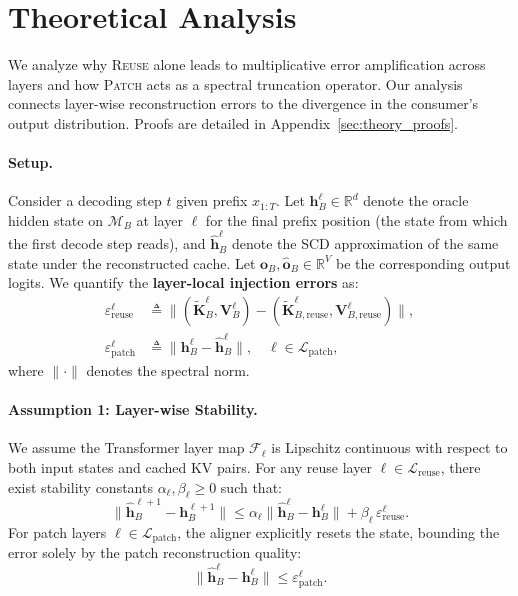 \documentclass{article}
\theoremstyle{plain}
\theoremstyle{definition}
\theoremstyle{remark}
\begin{document}
\section{Theoretical Analysis}
\label{sec:theory}

We analyze why \textsc{Reuse} alone leads to multiplicative error amplification across layers and how \textsc{Patch} acts as a spectral truncation operator.
Our analysis connects layer-wise reconstruction errors to the divergence in the consumer's output distribution.
Proofs are detailed in Appendix~\ref{sec:theory_proofs}.

\paragraph{Setup.}
Consider a decoding step $t$ given prefix $x_{1:T}$.
Let $\mathbf{h}_B^\ell \in \mathbb{R}^d$ denote the oracle hidden state on $\mathcal{M}_B$ at layer $\ell$ for the final prefix position (the state from which the first decode step reads), and $\hat{\mathbf{h}}_B^\ell$ denote the SCD approximation of the same state under the reconstructed cache.
Let $\mathbf{o}_B, \hat{\mathbf{o}}_B \in \mathbb{R}^{V}$ be the corresponding output logits.
We quantify the \textbf{layer-local injection errors} as:
\begin{align}
\varepsilon_{\mathrm{reuse}}^\ell &\triangleq \lVert (\tilde{\mathbf{K}}_B^\ell, \mathbf{V}_B^\ell) - (\tilde{\mathbf{K}}_{B,\mathrm{reuse}}^\ell, \mathbf{V}_{B,\mathrm{reuse}}^\ell) \rVert, \\
\varepsilon_{\mathrm{patch}}^\ell &\triangleq \lVert \mathbf{h}_B^\ell - \hat{\mathbf{h}}_B^\ell \rVert, \quad \ell \in \mathcal{L}_{\mathrm{patch}},
\end{align}
where $\lVert \cdot \rVert$ denotes the spectral norm.

\paragraph{Assumption 1: Layer-wise Stability.}
We assume the Transformer layer map $\mathcal{F}_\ell$ is Lipschitz continuous with respect to both input states and cached KV pairs.
For any reuse layer $\ell \in \mathcal{L}_{\mathrm{reuse}}$, there exist stability constants $\alpha_\ell, \beta_\ell \ge 0$ such that:
\begin{equation}
\label{eq:layer_stability}
\lVert \hat{\mathbf{h}}_B^{\ell+1} - \mathbf{h}_B^{\ell+1} \rVert
\le \alpha_\ell \lVert \hat{\mathbf{h}}_B^\ell - \mathbf{h}_B^\ell \rVert + \beta_\ell \, \varepsilon_{\mathrm{reuse}}^\ell.
\end{equation}
For patch layers $\ell \in \mathcal{L}_{\mathrm{patch}}$, the aligner explicitly resets the state, bounding the error solely by the patch reconstruction quality:
\begin{equation}
\label{eq:patch_reset}
\lVert \hat{\mathbf{h}}_B^{\ell} - \mathbf{h}_B^{\ell} \rVert \le \varepsilon_{\mathrm{patch}}^\ell.
\end{equation}
\end{document}
